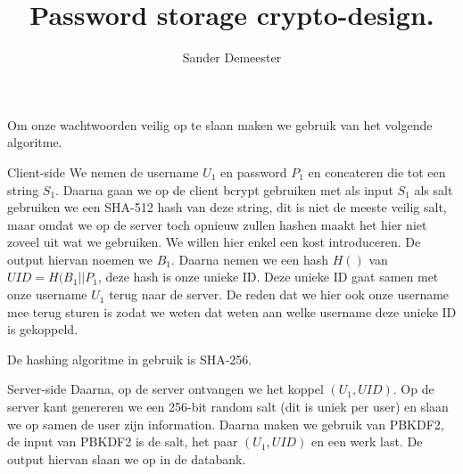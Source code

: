 \documentclass[10pt,a4paper]{report}
\author{Sander Demeester}
\title{Password storage crypto-design.}
\begin{document}
Om onze wachtwoorden veilig op te slaan maken we gebruik van het volgende algoritme.
\begin{subsection}{Client-side}
We nemen de username $U_{1}$ en password $P_{1}$ en concateren die tot een string $S_{1}$.
Daarna gaan we op de client bcrypt gebruiken met als input $S_{1}$ als salt gebruiken we een SHA-512 hash van deze string, dit is niet de meeste veilig salt, maar omdat we op de server toch opnieuw zullen hashen maakt het hier niet zoveel uit wat we gebruiken. We willen hier enkel een kost introduceren.
De output hiervan noemen we $B_{1}$. Daarna nemen we een hash $H()$ van $UID = H(B_{1} || P_{1}$, deze hash is onze unieke ID. Deze unieke ID gaat samen met onze username $U_{1}$ terug naar de server. De reden dat we hier ook onze username mee terug sturen is zodat we weten dat weten aan welke username deze unieke ID is gekoppeld. 

De hashing algoritme in gebruik is SHA-256. 
\end{subsection}
\begin{subsection}{Server-side}
Daarna, op de server ontvangen we het koppel $(U_{1},UID)$. Op de server kant genereren we een 256-bit random salt (dit is uniek per user) en slaan we op samen de user zijn information. Daarna maken we gebruik van PBKDF2, de input van PBKDF2 is de salt, het paar $(U_{1},UID)$ en een werk last. De output hiervan slaan we op in de databank. 
\end{subsection}
\end{document}
